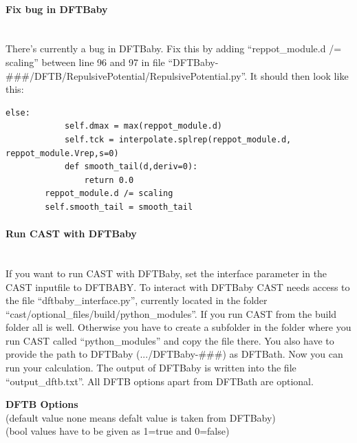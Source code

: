 \documentclass[10pt,a4paper]{article} %
\begin{document}
\paragraph{Fix bug in DFTBaby}\mbox{}\\

There's currently a bug in DFTBaby. Fix this by adding ``reppot\_module.d /= scaling'' between line 96 and 97 in file ``DFTBaby-\#\#\#/DFTB/RepulsivePotential/RepulsivePotential.py''. It should then look like this:
\begin{lstlisting}[firstnumber=92]
        else:
            self.dmax = max(reppot_module.d)
            self.tck = interpolate.splrep(reppot_module.d, reppot_module.Vrep,s=0)
            def smooth_tail(d,deriv=0):
                return 0.0
        reppot_module.d /= scaling
        self.smooth_tail = smooth_tail
\end{lstlisting}

\paragraph{Run CAST with DFTBaby}\mbox{}\\

If you want to run CAST with DFTBaby, set the interface parameter in the CAST inputfile to DFTBABY. To interact with DFTBaby CAST needs access to the file ``dftbaby\_interface.py'', currently located in the folder ``cast/optional\_files/build/python\_modules''. If you run CAST from the build folder all is well. Otherwise you have to create a subfolder in the folder where you run CAST called ``python\_modules'' and copy the file there. You also have to provide the path to DFTBaby (.../DFTBaby-\#\#\#) as DFTBath. Now you can run your calculation. The output of DFTBaby is written into the file ``output\_dftb.txt''. All DFTB options apart from DFTBath are optional. 


\textbf{DFTB Options} 
\\(default value none means defalt value is taken from DFTBaby)
\\(bool values have to be given as 1=true and 0=false)
\end{document}
